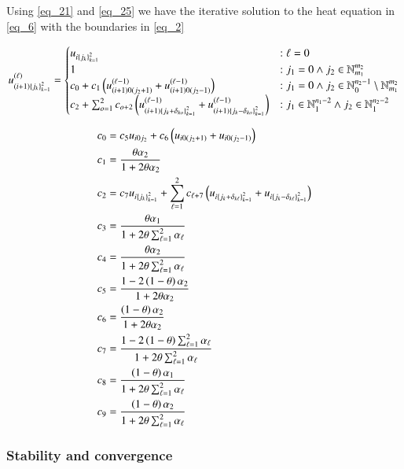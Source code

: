 \documentclass[11pt,english,a4paper]{article}
\begin{document}
\begin{flushleft}
Using \eqref{eq_21} and \eqref{eq_25} we have the iterative solution to the heat equation in \eqref{eq_6} with the boundaries in \eqref{eq_2}

\begin{align}
u_{(i+1)\left\lbrace{j_k}\right\rbrace_{k=1}^2}^{(\ell)} = \begin{cases}
u_{i\left\lbrace{j_k}\right\rbrace_{k=1}^2} &: \ell = 0 \\
1 &: j_1=0 \wedge j_2\in\mathbb{N}_{m_1}^{m_2} \\
c_0 + c_1\left({u_{(i+1)0(j_2+1)}^{(\ell-1)}+u_{(i+1)0(j_2-1)}^{(\ell-1)}}\right) &: j_1=0 \wedge j_2\in\mathbb{N}_0^{n_2-1} \setminus\mathbb{N}_{m_1}^{m_2} \\
c_2 + \sum_{o=1}^2 c_{o+2}\left({u_{(i+1)\left\lbrace{j_k+\delta_{ko}}\right\rbrace_{k=1}^2}^{(\ell-1)}+u_{(i+1)\left\lbrace{j_k-\delta_{ko}}\right\rbrace_{k=1}^2}^{(\ell-1)}}\right) &: j_1\in \mathbb{N}_{1}^{n_1-2} \wedge j_2\in\mathbb{N}_1^{n_2-2} 
\end{cases} 
\label{eq_26}
\end{align}

\begin{align}
c_0 &= c_5 u_{i0j_2} + c_6\left({u_{i0(j_2+1)} + u_{i0(j_2-1)}}\right)
\label{eq_27}\\
c_1 &= \frac{\theta \alpha_2}{1+2\theta\alpha_2}
\label{eq_28}\\
c_2 &= c_7 u_{i\left\lbrace{j_k}\right\rbrace_{k=1}^2} + \sum_{\ell=1}^2 c_{\ell+7} \left({u_{i\left\lbrace{j_k+\delta_{k\ell}}\right\rbrace_{k=1}^2} + u_{i\left\lbrace{j_k-\delta_{k\ell}}\right\rbrace_{k=1}^2}}\right)
\label{eq_29}\\
c_3 &= \frac{\theta \alpha_1}{1+ 2\theta \sum_{\ell = 1}^2 \alpha_\ell}
\label{eq_30}\\
c_4 &= \frac{\theta \alpha_2}{1+ 2\theta \sum_{\ell = 1}^2 \alpha_\ell}
\label{eq_31}\\
c_5 &= \frac{1-2\left({1-\theta}\right)\alpha_2}{1+2\theta \alpha_2} 
\label{eq_32}\\
c_6 &= \frac{\left({1-\theta}\right)\alpha_2}{1+2\theta \alpha_2} 
\label{eq_33}\\
c_7 &= \frac{1-2\left({1-\theta}\right)\sum_{\ell = 1}^2 \alpha_\ell}{1+ 2\theta \sum_{\ell = 1}^2 \alpha_\ell}
\label{eq_34}\\
c_8 &= \frac{\left({1-\theta}\right)\alpha_1}{1+ 2\theta \sum_{\ell = 1}^2 \alpha_\ell}
\label{eq_35}\\
c_9 &= \frac{\left({1-\theta}\right)\alpha_2}{1+ 2\theta \sum_{\ell = 1}^2 \alpha_\ell}
\label{eq_36}
\end{align}

\subsubsection{Stability and convergence}


\end{flushleft}
\end{document}
